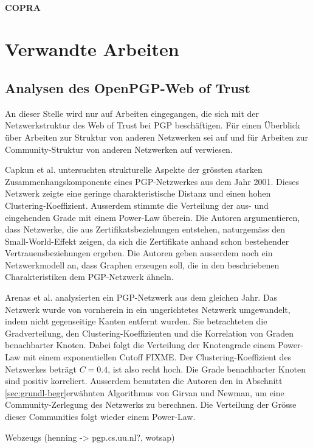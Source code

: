 \paragraph{COPRA}
\label{sec:copra}

\section{Verwandte Arbeiten}
\label{ch:Grundlagen:sec:RelatedWork}

\subsection{Analysen des OpenPGP-Web of Trust}
\label{ch:Grundlagen:sec:RelatedWork:subsec:wot-analysis}

An dieser Stelle wird nur auf Arbeiten eingegangen, die sich mit der
Netzwerkstruktur des Web of Trust bei PGP besch\"aftigen. F\"ur einen
\"Uberblick \"uber Arbeiten zur Struktur von anderen Netzwerken sei
auf \cite{newman:167}und f\"ur Arbeiten zur Community-Struktur von
anderen Netzwerken auf \cite{Fortunato2010} verwiesen.

Capkun et al. \cite{Capkun2002} untersuchten strukturelle Aspekte der
gr\"ossten starken Zusammenhangskomponente eines PGP-Netzwerkes aus
dem Jahr 2001. Dieses Netzwerk zeigte eine geringe charakteristische
Distanz und einen hohen Clustering-Koeffizient. Ausserdem stimmte die
Verteilung der aus- und eingehenden Grade mit einem Power-Law
\"uberein. Die Autoren argumentieren, dass Netzwerke, die aus
Zertifikatsbeziehungen entstehen, naturgem\"ass den Small-World-Effekt
zeigen, da sich die Zertifikate anhand schon bestehender
Vertrauensbeziehungen ergeben. Die Autoren geben ausserdem noch ein
Netzwerkmodell an, dass Graphen erzeugen soll, die in den
beschriebenen Charakteristiken dem PGP-Netzwerk \"ahneln.

Arenas et al. \cite{Boguna2004} analysierten ein PGP-Netzwerk aus dem
gleichen Jahr. Das Netzwerk wurde von vornherein in ein ungerichtetes
Netzwerk umgewandelt, indem nicht gegenseitige Kanten entfernt
wurden. Sie betrachteten die Gradverteilung, den
Clustering-Koeffizienten und die Korrelation von Graden benachbarter
Knoten. Dabei folgt die Verteilung der Knotengrade einem Power-Law mit
einem exponentiellen Cutoff FIXME. Der Clustering-Koeffizient des
Netzwerkes betr\"agt $C=0.4$, ist also recht hoch. Die Grade
benachbarter Knoten sind positiv korreliert. Ausserdem benutzten die
Autoren den in Abschnitt \ref{sec:grundl-begr}erw\"ahnten Algorithmus
von Girvan und Newman, um eine Community-Zerlegung des Netzwerks zu
berechnen. Die Verteilung der Gr\"osse dieser Communities folgt wieder
einem Power-Law.

Webzeugs (henning -> pgp.cs.uu.nl?, wotsap)

